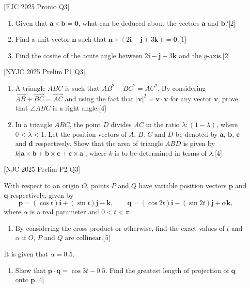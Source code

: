 \documentclass[a4paper,11pt,oneside]{book}
\providecommand{\vv}[1]{\overrightarrow{#1}}\providecommand{\cvv}[3]{\begin{pmatrix}#1\\#2\\#3\end{pmatrix}}
\newcounter{wq}
\newcommand{\Q}[1]{\par\needspace{5\baselineskip}\medskip\stepcounter{wq}\noindent\textbf{\thewq}\quad #1\par}
\begin{document}
\Q{\textcolor{black!60}{\small[EJC 2025 Promo Q3]}\par\smallskip
\begin{enumerate}[label=\textbf{(\alph*)},leftmargin=2.2em,itemsep=3pt]
\item Given that $\mathbf a\times\mathbf b=\mathbf 0$, what can be deduced about the vectors $\mathbf a$ and $\mathbf b$?\hfill[2]
\item Find a unit vector $\mathbf n$ such that $\mathbf n\times(2\mathbf i-\mathbf j+3\mathbf k)=\mathbf 0$.\hfill[1]
\item Find the cosine of the acute angle between $2\mathbf i-\mathbf j+3\mathbf k$ and the $y$-axis.\hfill[2]
\end{enumerate}}

\Q{\textcolor{black!60}{\small[NYJC 2025 Prelim P1 Q3]}\par\smallskip
\begin{enumerate}[label=\textbf{(\alph*)},leftmargin=2.2em,itemsep=3pt]
\item A triangle $ABC$ is such that $AB^2+BC^2=AC^2$. By considering $\vv{AB}+\vv{BC}=\vv{AC}$ and using the fact that $|\mathbf v|^2=\mathbf v\cdot\mathbf v$ for any vector $\mathbf v$, prove that $\angle ABC$ is a right angle.\hfill[4]
\item In a triangle $ABC$, the point $D$ divides $AC$ in the ratio $\lambda:(1-\lambda)$, where $0<\lambda<1$. Let the position vectors of $A$, $B$, $C$ and $D$ be denoted by $\mathbf a$, $\mathbf b$, $\mathbf c$ and $\mathbf d$ respectively. Show that the area of triangle $ABD$ is given by $k|\mathbf a\times\mathbf b+\mathbf b\times\mathbf c+\mathbf c\times\mathbf a|$, where $k$ is to be determined in terms of $\lambda$.\hfill[4]
\end{enumerate}}

\Q{\textcolor{black!60}{\small[NJC 2025 Prelim P2 Q3]}\par\smallskip
With respect to an origin $O$, points $P$ and $Q$ have variable position vectors $\mathbf p$ and $\mathbf q$ respectively, given by
\[\mathbf p=(\cos t)\mathbf i+(\sin t)\mathbf j-\mathbf k,\qquad
\mathbf q=(\cos 2t)\mathbf i-(\sin 2t)\mathbf j+\alpha\mathbf k,\]
where $\alpha$ is a real parameter and $0<t<\pi$.
\begin{enumerate}[label=\textbf{(\roman*)},leftmargin=2.2em,itemsep=3pt]
\item By considering the cross product or otherwise, find the exact values of $t$ and $\alpha$ if $O$, $P$ and $Q$ are collinear.\hfill[5]
\end{enumerate}
It is given that $\alpha=0.5$.
\begin{enumerate}[label=\textbf{(\roman*)},leftmargin=2.2em,itemsep=3pt,start=2]
\item Show that $\mathbf p\cdot\mathbf q=\cos 3t-0.5$. Find the greatest length of projection of $\mathbf q$ onto $\mathbf p$.\hfill[4]
\end{enumerate}}
\end{document}
